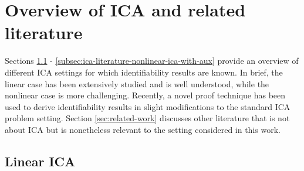 


\section{Overview of ICA and related literature}\label{sec:ica-literature-overview}

Sections \ref{subsec:ica-literature-linear-ica} - \ref{subsec:ica-literature-nonlinear-ica-with-aux} provide an overview of different ICA settings for which identifiability results are known.
In brief, the linear case has been extensively studied and is well understood, while the nonlinear case is more challenging.
Recently, a novel proof technique has been used to derive identifiability results in slight modifications to the standard ICA problem setting.
Section \ref{sec:related-work} discusses other literature that is not about ICA but is nonetheless relevant to the setting considered in this work.



\subsection{Linear ICA}\label{subsec:ica-literature-linear-ica}



